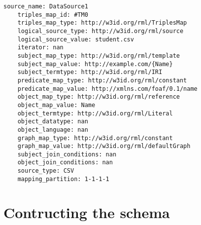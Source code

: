 \begin{lstlisting}[caption={Example of a mapping rule in Morph-KGC}, label={lst:mapping_rule}, captionpos=b, basicstyle=\small]
    source_name: DataSource1 
    triples_map_id: #TM0
    triples_map_type: http://w3id.org/rml/TriplesMap
    logical_source_type: http://w3id.org/rml/source
    logical_source_value: student.csv
    iterator: nan
    subject_map_type: http://w3id.org/rml/template
    subject_map_value: http://example.com/{Name}
    subject_termtype: http://w3id.org/rml/IRI
    predicate_map_type: http://w3id.org/rml/constant
    predicate_map_value: http://xmlns.com/foaf/0.1/name
    object_map_type: http://w3id.org/rml/reference
    object_map_value: Name
    object_termtype: http://w3id.org/rml/Literal
    object_datatype: nan
    object_language: nan
    graph_map_type: http://w3id.org/rml/constant
    graph_map_value: http://w3id.org/rml/defaultGraph
    subject_join_conditions: nan
    object_join_conditions: nan
    source_type: CSV
    mapping_partition: 1-1-1-1
\end{lstlisting}

\section{Contructing the schema}
\label{section:constructing_schema}